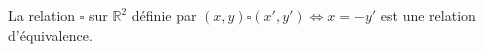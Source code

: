 La relation $\square$ sur $\mathbb R^2$ définie par $(x,y)\square (x',y') \iff x=-y'$ est une relation d'équivalence.

\begin{reponses}
\end{reponses}

